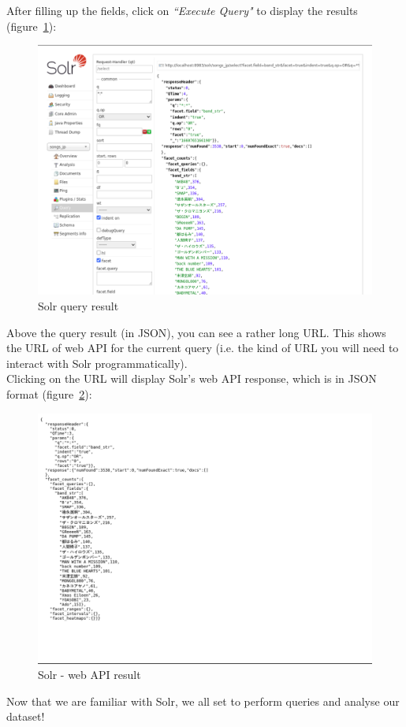 \bigskip
\bigskip

After filling up the fields, click on \emph{``Execute Query"} to display the results (figure~\ref{fig:solr-query-result}):

\begin{figure}[h]
	\centering
	\includegraphics[width=0.75\linewidth]{files/images/solr-query-result}
	\caption{Solr query result}
	\label{fig:solr-query-result}
\end{figure}

\bigskip

Above the query result (in JSON), you can see a rather long URL. This shows the URL of web API for the current query (i.e. the kind of URL you will need to interact with Solr programmatically). \\

Clicking on the URL will display Solr's web API response, which is in JSON format (figure~\ref{fig:solr-web-api-result-json}):

\newpage

\begin{figure}[h]
	\centering
	\includegraphics[width=0.75\linewidth]{files/images/solr-web-api-result}
	\caption{Solr - web API result}
	\label{fig:solr-web-api-result-json}
\end{figure}


\bigskip
\bigskip
\bigskip

Now that we are familiar with Solr, we all set to perform queries and analyse our dataset!

